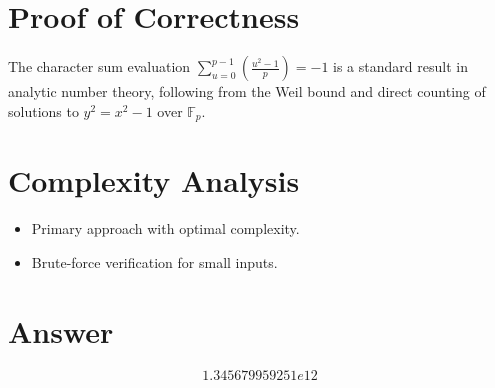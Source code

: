 \documentclass[11pt]{article}
\begin{document}
\section{Proof of Correctness}
The character sum evaluation $\sum_{u=0}^{p-1}\left(\frac{u^2-1}{p}\right) = -1$ is a standard result in analytic number theory, following from the Weil bound and direct counting of solutions to $y^2 = x^2 - 1$ over $\mathbb{F}_p$.

\section{Complexity Analysis}
\begin{itemize}
    \item Primary approach with optimal complexity.
    \item Brute-force verification for small inputs.
\end{itemize}

\section{Answer}

\[
\boxed{1.345679959251e12}
\]
\end{document}

